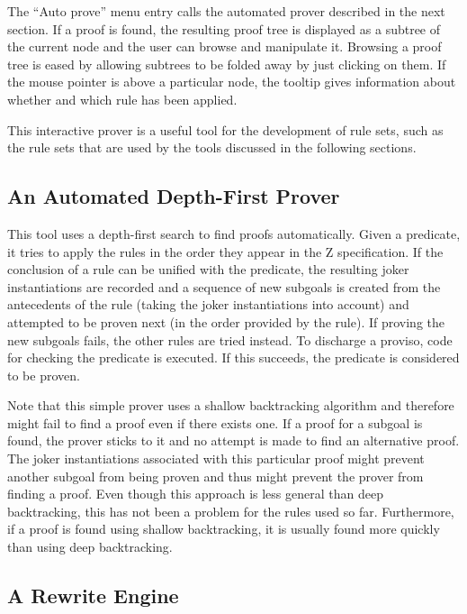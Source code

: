 \documentclass{entcs}
\begin{document}
The ``Auto prove'' menu entry calls the automated prover described in
the next section.  If a proof is found, the resulting proof tree is
displayed as a subtree of the current node and the user can browse and
manipulate it.  Browsing a proof tree is eased by allowing subtrees to
be folded away by just clicking on them.  If the mouse pointer is
above a particular node, the tooltip gives information about whether
and which rule has been applied.

This interactive prover is a useful tool for the development of rule sets,
such as the rule sets that are used by the tools discussed in the following
sections.


\subsection{An Automated Depth-First Prover} \label{sec:prover}

This tool uses a depth-first search to find proofs automatically.
Given a predicate, it tries to apply the rules in the order they
appear in the Z specification.  If the conclusion of a rule can be
unified with the predicate, the resulting joker instantiations are
recorded and a sequence of new subgoals is created from the
antecedents of the rule (taking the joker instantiations into account)
and attempted to be proven next (in the order provided by the rule).
If proving the new subgoals fails, the other rules are tried instead.
To discharge a proviso, code for checking the predicate is executed.
If this succeeds, the predicate is considered to be proven.

Note that this simple prover uses a shallow backtracking algorithm and
therefore might fail to find a proof even if there exists one.  If a
proof for a subgoal is found, the prover sticks to it and no attempt
is made to find an alternative proof.  The joker instantiations
associated with this particular proof might prevent another subgoal
from being proven and thus might prevent the prover from finding a
proof.  Even though this approach is less general than deep
backtracking, this has not been a problem for the rules used so far.
Furthermore, if a proof is found using shallow backtracking, it is
usually found more quickly than using deep backtracking.

\subsection{A Rewrite Engine} \label{sec:rewrite}
\end{document}
